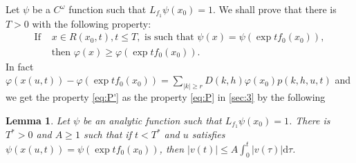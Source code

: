 \documentclass{article}
\newtheorem{lemma}{Lemma}[section]
\newcommand{\dd}{\mathrm{d}}
\begin{document}
Let $\psi$ be a $C^\omega$ function such that $L_{f_1} \psi\left(x_0\right)=1$.
We shall prove that there is $T>0$ with the following property:
\begin{equation}
	\label{eq:P'} \tag{P'}
	\begin{split}
		\text{If } & x \in R\left(x_0, t\right), t \leq T, \text{ is such that } \psi(x)=\psi\left(\exp t f_0\left(x_0\right)\right), \\
		& \text{then } \varphi(x) \geq \varphi(\exp t f_0(x_0)).
	\end{split}
\end{equation}
In fact $\varphi(x(u,t))-\varphi(\exp t f_0(x_0)) = \sum_{|k|\geq r} D(k,h) \varphi(x_0) p(k,h,u,t)$ and we get the property \eqref{eq:P'} as the property \eqref{eq:P} in \cref{sec:3} by the following

\begin{lemma}
	Let $\psi$ be an analytic function such that $L_{f_1} \psi\left(x_0\right)=1$. There is $T^*>0$ and $A \geq 1$ such that if $t<T^*$ and $u$ satisfies $\psi(x(u, t))=\psi(\exp t f_0(x_0))$, then $|v(t)| \leq A \int_0^t |v(\tau)|\dd\tau$.
\end{lemma}
\end{document}
